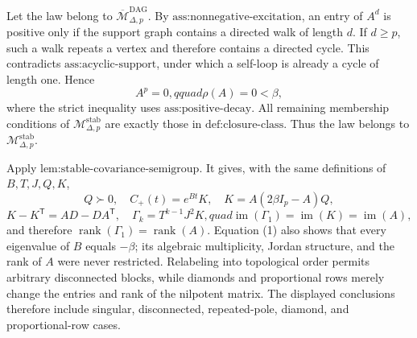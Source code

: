 Let the law belong to \(\overline{\mathcal M}_{\Delta,p}^{\mathrm{DAG}}\).  By \(\text{ass:nonnegative-excitation}\), an entry of \(A^d\) is positive only if the support graph contains a directed walk of length \(d\).  If \(d\geq p\), such a walk repeats a vertex and therefore contains a directed cycle.  This contradicts \(\text{ass:acyclic-support}\), under which a self-loop is already a cycle of length one.  Hence
\[
 A^p=0,qquad \rho(A)=0<\beta,
\tag{1}
\]
where the strict inequality uses \(\text{ass:positive-decay}\).  All remaining membership conditions of \(\mathcal M_{\Delta,p}^{\mathrm{stab}}\) are exactly those in \(\text{def:closure-class}\).  Thus the law belongs to \(\mathcal M_{\Delta,p}^{\mathrm{stab}}\).

Apply \(\text{lem:stable-covariance-semigroup}\).  It gives, with the same definitions of \(B,T,J,Q,K\),
\[
 Q\succ0,\quad C_+(t)=e^{Bt}K,\quad K=A(2\beta I_p-A)Q,
\]
\[
 K-K^{\mathsf T}=AD-DA^{\mathsf T},\quad
 \Gamma_k=T^{k-1}J^2K,quad
 \operatorname{im}(\Gamma_1)=\operatorname{im}(K)=\operatorname{im}(A),
\]
and therefore \(\operatorname{rank}(\Gamma_1)=\operatorname{rank}(A)\).  Equation (1) also shows that every eigenvalue of \(B\) equals \(-\beta\); its algebraic multiplicity, Jordan structure, and the rank of \(A\) were never restricted.  Relabeling into topological order permits arbitrary disconnected blocks, while diamonds and proportional rows merely change the entries and rank of the nilpotent matrix.  The displayed conclusions therefore include singular, disconnected, repeated-pole, diamond, and proportional-row cases.
